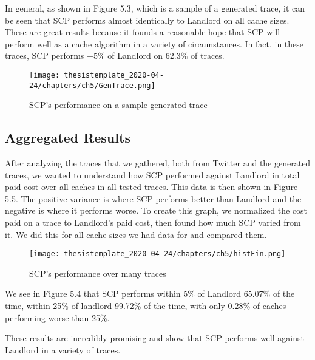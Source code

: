 In general, as shown in Figure 5.3, which is a sample of a generated trace, it can be seen that SCP performs almost identically to Landlord on all cache sizes. These are great results because it founds a reasonable hope that SCP will perform well as a cache algorithm in a variety of circumstances. In fact, in these traces, SCP performs $\pm 5\%$ of Landlord on $62.3\%$ of traces.


\begin{figure}[H]
    \centering
    \texttt{[image: thesistemplate\_2020-04-24/chapters/ch5/GenTrace.png]}
    \caption{SCP's performance on a sample generated trace}
    \label{fig:my_label}
\end{figure}

\subsection{Aggregated Results}
After analyzing the traces that we gathered, both from Twitter and the generated traces, we wanted to understand how SCP performed against Landlord in total paid cost over all caches in all tested traces. This data is then shown in Figure 5.5. The positive variance is where SCP performs better than Landlord and the negative is where it performs worse. To create this graph, we normalized the cost paid on a trace to Landlord's paid cost, then found how much SCP varied from it. We did this for all cache sizes we had data for and compared them.

\begin{figure}[ht]
  \begin{center}
    \texttt{[image: thesistemplate\_2020-04-24/chapters/ch5/histFin.png]}
  \end{center}
  \caption{SCP's performance over many traces}
\end{figure}


We see in Figure 5.4 that SCP performs within 5\% of Landlord 65.07\% of the time, within 25\% of landlord 99.72\% of the time, with only 0.28\% of caches performing worse than 25\%.

These results are incredibly promising and show that SCP performs well against Landlord in a variety of traces.